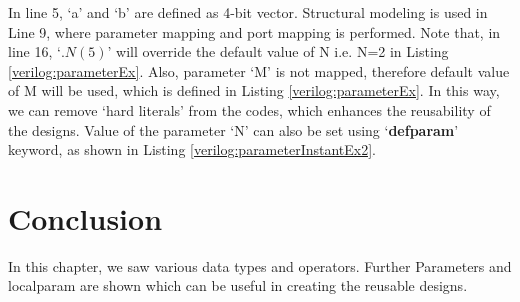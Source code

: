 


\begin{explanation}
	In line 5, `a' and `b' are defined as 4-bit vector. Structural modeling is used in Line 9, where parameter mapping and port mapping is performed. Note that, in line 16, `$.N(5)$' will override the default value of N i.e. N=2 in Listing \ref{verilog:parameterEx}. Also, parameter `M' is not mapped, therefore default value of M will be used, which is defined in Listing \ref{verilog:parameterEx}. In this way, we can remove `hard literals' from the codes, which enhances the reusability of the designs.
	Value of the parameter `N' can also be set using `\textbf{defparam}' keyword, as shown in Listing \ref{verilog:parameterInstantEx2}.
\end{explanation}





\section{Conclusion}
In this chapter, we saw various  data types and operators. Further Parameters and localparam are shown which can be useful in creating the reusable designs. 
